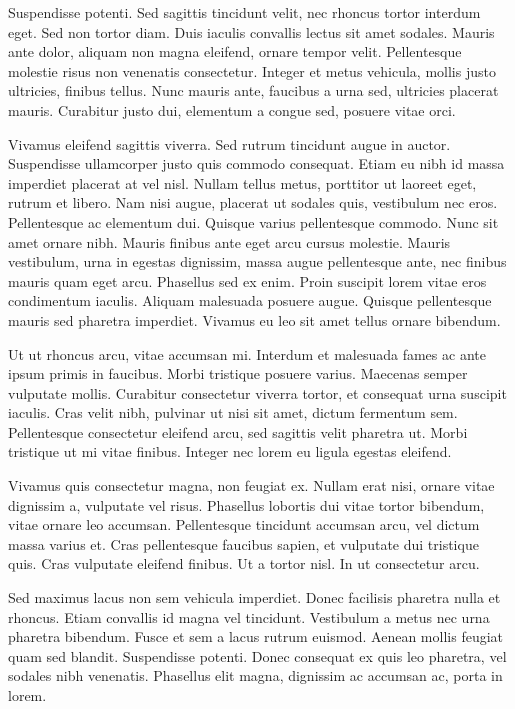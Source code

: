 Suspendisse potenti. Sed sagittis tincidunt velit, nec rhoncus tortor interdum eget. Sed non tortor diam. Duis iaculis convallis lectus sit amet sodales. Mauris ante dolor, aliquam non magna eleifend, ornare tempor velit. Pellentesque molestie risus non venenatis consectetur. Integer et metus vehicula, mollis justo ultricies, finibus tellus. Nunc mauris ante, faucibus a urna sed, ultricies placerat mauris. Curabitur justo dui, elementum a congue sed, posuere vitae orci.

Vivamus eleifend sagittis viverra. Sed rutrum tincidunt augue in auctor. Suspendisse ullamcorper justo quis commodo consequat. Etiam eu nibh id massa imperdiet placerat at vel nisl. Nullam tellus metus, porttitor ut laoreet eget, rutrum et libero. Nam nisi augue, placerat ut sodales quis, vestibulum nec eros. Pellentesque ac elementum dui. Quisque varius pellentesque commodo. Nunc sit amet ornare nibh. Mauris finibus ante eget arcu cursus molestie. Mauris vestibulum, urna in egestas dignissim, massa augue pellentesque ante, nec finibus mauris quam eget arcu. Phasellus sed ex enim. Proin suscipit lorem vitae eros condimentum iaculis. Aliquam malesuada posuere augue. Quisque pellentesque mauris sed pharetra imperdiet. Vivamus eu leo sit amet tellus ornare bibendum.

Ut ut rhoncus arcu, vitae accumsan mi. Interdum et malesuada fames ac ante ipsum primis in faucibus. Morbi tristique posuere varius. Maecenas semper vulputate mollis. Curabitur consectetur viverra tortor, et consequat urna suscipit iaculis. Cras velit nibh, pulvinar ut nisi sit amet, dictum fermentum sem. Pellentesque consectetur eleifend arcu, sed sagittis velit pharetra ut. Morbi tristique ut mi vitae finibus. Integer nec lorem eu ligula egestas eleifend.

Vivamus quis consectetur magna, non feugiat ex. Nullam erat nisi, ornare vitae dignissim a, vulputate vel risus. Phasellus lobortis dui vitae tortor bibendum, vitae ornare leo accumsan. Pellentesque tincidunt accumsan arcu, vel dictum massa varius et. Cras pellentesque faucibus sapien, et vulputate dui tristique quis. Cras vulputate eleifend finibus. Ut a tortor nisl. In ut consectetur arcu.

Sed maximus lacus non sem vehicula imperdiet. Donec facilisis pharetra nulla et rhoncus. Etiam convallis id magna vel tincidunt. Vestibulum a metus nec urna pharetra bibendum. Fusce et sem a lacus rutrum euismod. Aenean mollis feugiat quam sed blandit. Suspendisse potenti. Donec consequat ex quis leo pharetra, vel sodales nibh venenatis. Phasellus elit magna, dignissim ac accumsan ac, porta in lorem.

